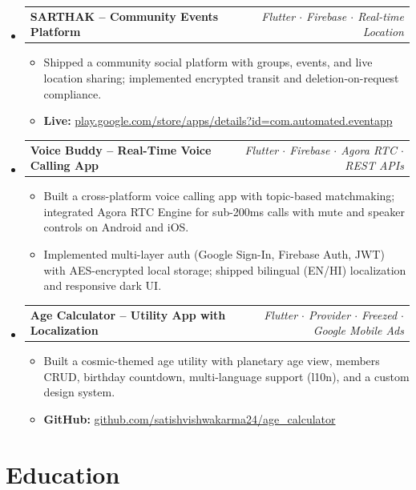 \documentclass[a4paper,10pt]{article}
\makeatletter
\newcommand{\resumeProjectHeading}[2]{
  \vspace{2pt}\item
  \begin{tabular*}{\textwidth}{l@{\extracolsep{\fill}}r}
    \textbf{#1} & \textit{\small #2} \\
  \end{tabular*}\vspace{-4pt}
}
\newcommand{\resumeItem}[1]{\item\small{#1\vspace{-1pt}}}
\makeatother
\begin{document}
\begin{itemize}[leftmargin=0.15in, label={}]
\vspace{4pt}

\resumeProjectHeading
  {SARTHAK \textnormal{-- Community Events Platform}}
  {Flutter $\cdot$ Firebase $\cdot$ Real-time Location}
\begin{itemize}[leftmargin=*]
  \resumeItem{Shipped a community social platform with groups, events, and live location sharing; implemented encrypted transit and deletion-on-request compliance.}
  \resumeItem{\textbf{Live:} \href{https://play.google.com/store/apps/details?id=com.automated.eventapp}{play.google.com/store/apps/details?id=com.automated.eventapp}}
\end{itemize}

\vspace{4pt}

\resumeProjectHeading
  {Voice Buddy \textnormal{-- Real-Time Voice Calling App}}
  {Flutter $\cdot$ Firebase $\cdot$ Agora RTC $\cdot$ REST APIs}
\begin{itemize}[leftmargin=*]
  \resumeItem{Built a cross-platform voice calling app with topic-based matchmaking; integrated Agora RTC Engine for sub-200ms calls with mute and speaker controls on Android and iOS.}
  \resumeItem{Implemented multi-layer auth (Google Sign-In, Firebase Auth, JWT) with AES-encrypted local storage; shipped bilingual (EN/HI) localization and responsive dark UI.}
\end{itemize}

\vspace{4pt}

\resumeProjectHeading
  {Age Calculator \textnormal{-- Utility App with Localization}}
  {Flutter $\cdot$ Provider $\cdot$ Freezed $\cdot$ Google Mobile Ads}
\begin{itemize}[leftmargin=*]
  \resumeItem{Built a cosmic-themed age utility with planetary age view, members CRUD, birthday countdown, multi-language support (l10n), and a custom design system.}
  \resumeItem{\textbf{GitHub:} \href{https://github.com/satishvishwakarma24/age_calculator}{github.com/satishvishwakarma24/age\_calculator}}
\end{itemize}

\end{itemize}

\section{Education}
\end{document}
